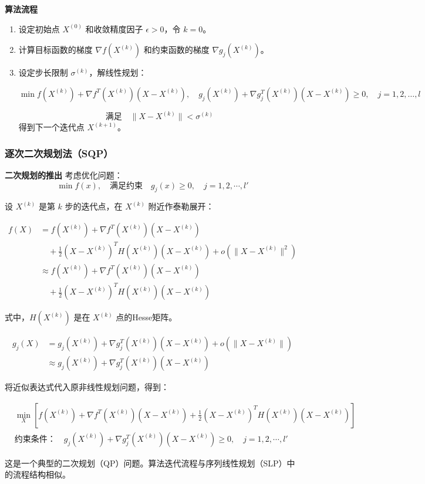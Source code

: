 \begin{notebox}{\textbf{算法流程}}{}
\begin{enumerate}
\item 设定初始点 \( X^{(0)} \) 和收敛精度因子 \( \epsilon > 0 \)，令 \( k = 0 \)。
\item 计算目标函数的梯度 \( \nabla f(X^{(k)}) \) 和约束函数的梯度 \( \nabla g_j(X^{(k)}) \)。
\item 设定步长限制 \( \sigma^{(k)} \)，解线性规划：

\[
\min f(X^{(k)}) + \nabla f^T(X^{(k)})(X - X^{(k)}), \quad g_j(X^{(k)}) + \nabla g_j^T(X^{(k)})(X - X^{(k)}) \geq 0, \quad j = 1, 2, \dots, l
\]

\[
\text{满足} \quad \| X - X^{(k)} \| < \sigma^{(k)}
\]
得到下一个迭代点 \( X^{(k+1)} \)。
\end{enumerate}
\end{notebox}
\subsubsection{逐次二次规划法（SQP）}
\begin{thmbox}{\textbf{二次规划的推出}}{}
    考虑优化问题：
    \[
    \min f(x), \quad \text{满足约束} \quad g_j(x) \geq 0, \quad j = 1, 2, \cdots, l'
    \]
    
    设 \( X^{(k)} \) 是第 \( k \) 步的迭代点，在 \( X^{(k)} \) 附近作泰勒展开：
    
    \begin{align*}
    f(X) &= f(X^{(k)}) + \nabla f^T(X^{(k)})(X - X^{(k)}) \\
    &\quad + \frac{1}{2}(X - X^{(k)})^T H(X^{(k)})(X - X^{(k)}) + o(\|X - X^{(k)}\|^2) \\
    &\approx f(X^{(k)}) + \nabla f^T(X^{(k)})(X - X^{(k)}) \\
    &\quad + \frac{1}{2}(X - X^{(k)})^T H(X^{(k)})(X - X^{(k)})
    \end{align*}
    
    式中，\( H(X^{(k)}) \) 是在 \( X^{(k)} \) 点的Hesse矩阵。
    
    \begin{align*}
    g_j(X) &= g_j(X^{(k)}) + \nabla g_j^T(X^{(k)})(X - X^{(k)}) + o(\|X - X^{(k)}\|) \\
    &\approx g_j(X^{(k)}) + \nabla g_j^T(X^{(k)})(X - X^{(k)})
    \end{align*}
    
    将近似表达式代入原非线性规划问题，得到：
    
    \begin{align*}
    &\min_X \left[ f(X^{(k)}) + \nabla f^T(X^{(k)})(X-X^{(k)}) + \frac{1}{2}(X-X^{(k)})^T H(X^{(k)})(X-X^{(k)}) \right] \\
    &\text{约束条件：} \quad g_j(X^{(k)}) + \nabla g_j^T(X^{(k)})(X-X^{(k)}) \geq 0, \quad j=1,2,\cdots,l'
    \end{align*}
    
\end{thmbox}
这是一个典型的二次规划（QP）问题。算法迭代流程与序列线性规划（SLP）中的流程结构相似。

